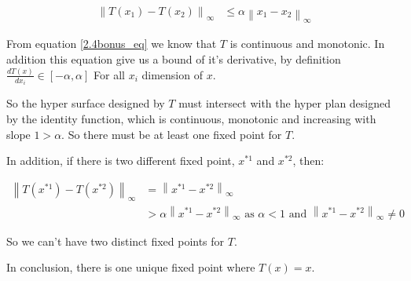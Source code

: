 


\begin{align}
    \left\| T(x_1) - T(x_2) \right\|_{\infty} &\leq \alpha \left\| x_1 - x_2 \right\|_{\infty} \label{2.4bonus_eq}
\end{align}


From equation \ref{2.4bonus_eq} we know that $T$ is continuous and monotonic.
In addition this equation give us a bound of it's derivative, by definition $\frac{dT(x)}{dx_i} \in [-\alpha,\alpha]$ For all $x_i$ dimension of $x$.

So the hyper surface designed by $T$ must intersect with the hyper plan designed by the identity function, which is continuous, monotonic and increasing with slope $1 > \alpha$.
So there must be at least one fixed point for $T$.

In addition, if there is two different fixed point, $x^{*1}$ and $x^{*2}$, then:

\begin{align*}
    \left\| T(x^{*1}) - T(x^{*2}) \right\|_\infty
    &= \left\| x^{*1} - x^{*2} \right\|_\infty \\
    &> \alpha \left\| x^{*1} - x^{*2} \right\|_\infty \text{ as } \alpha < 1 \text{ and } \left\| x^{*1} - x^{*2} \right\|_\infty \neq 0
\end{align*}

So we can't have two distinct fixed points for $T$.

In conclusion, there is one unique fixed point where $T(x) = x$.

